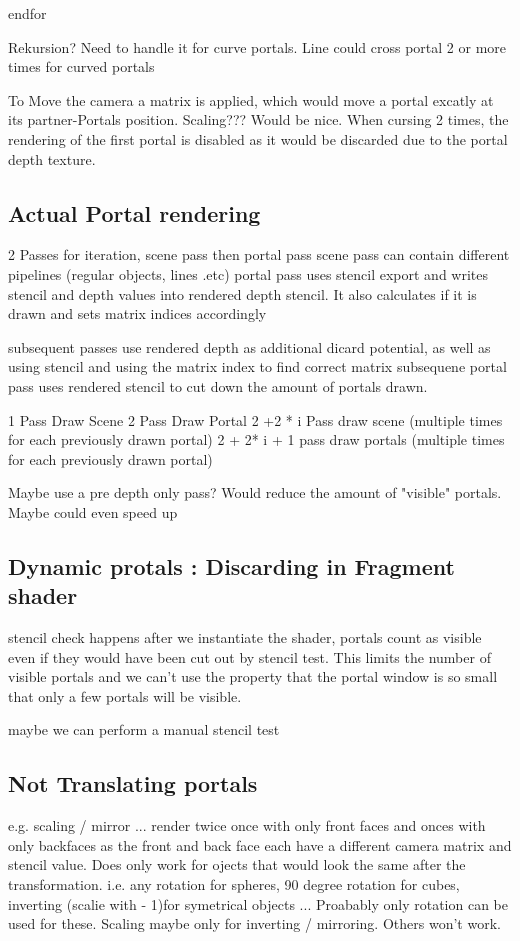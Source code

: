 endfor

Rekursion? Need to handle it for curve portals. Line could cross portal 2 or more times for curved portals


To Move the camera a matrix is applied, which would move a portal excatly at its partner-Portals position. Scaling??? Would be nice.
When cursing 2 times, the rendering of the first portal is disabled as it would be discarded due to the portal depth texture.

\subsection{Actual Portal rendering}
2 Passes for iteration, scene pass then portal pass
scene pass can contain different pipelines (regular objects, lines .etc)
portal pass uses stencil export and writes stencil and depth values into rendered depth stencil. It also calculates if it is drawn and sets matrix indices accordingly

subsequent passes use rendered depth as additional dicard potential, as well as using stencil and using the matrix index to find correct matrix
subsequene portal pass uses rendered stencil to cut down the amount of portals drawn. 

1 Pass Draw Scene
2 Pass Draw Portal
2 +2 * i Pass draw scene (multiple times for each previously drawn portal)
2 + 2* i + 1 pass draw portals (multiple times for each previously drawn portal)



Maybe use a pre depth only pass? Would reduce the amount of "visible" portals. Maybe could even speed up

\subsection{ Dynamic protals : Discarding in Fragment shader}
stencil check happens after we instantiate the shader, portals count as visible even if they would have been cut out by stencil test. This limits the number of visible portals and we can't use the property that the portal window is so small that only a few portals will be visible.

maybe we can perform a manual stencil test

\subsection{Not Translating portals}
e.g. scaling / mirror ...
render twice once with only front faces and onces with only backfaces as the front and back face each have a different camera matrix and stencil value.
Does only work for ojects that would look the same after the transformation. i.e. any rotation for spheres, 90 degree rotation for cubes, inverting (scalie with - 1)for symetrical objects ...
Proabably only rotation can be used for these. Scaling maybe only for inverting / mirroring. Others won't work.


